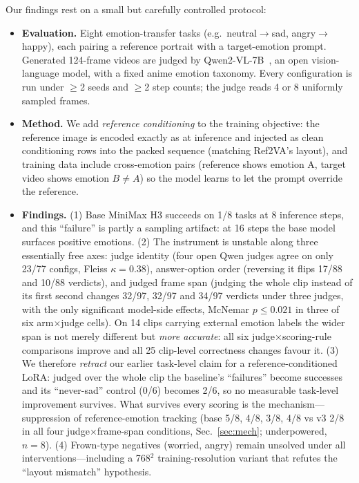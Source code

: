 \documentclass[conference]{IEEEtran}
\begin{document}
Our findings rest on a small but carefully controlled protocol:
\begin{itemize}
\item \textbf{Evaluation.} Eight emotion-transfer tasks (e.g.\ neutral$\rightarrow$sad,
angry$\rightarrow$happy), each pairing a reference portrait with a target-emotion prompt.
Generated 124-frame videos are judged by Qwen2-VL-7B~\cite{qwen2vl2024}, an open vision-language
model, with a fixed anime emotion taxonomy. Every configuration is run under $\ge$2 seeds and
$\ge$2 step counts; the judge reads 4 or 8 uniformly sampled frames.
\item \textbf{Method.} We add \emph{reference conditioning} to the training objective: the
reference image is encoded exactly as at inference and injected as clean conditioning rows into
the packed sequence (matching Ref2VA's layout), and training data include cross-emotion pairs
(reference shows emotion A, target video shows emotion $B\neq A$) so the model learns to let the
prompt override the reference.
\item \textbf{Findings.} (1) Base MiniMax H3 succeeds on 1/8 tasks at 8 inference steps, and this
``failure'' is partly a sampling artifact: at 16 steps the base model surfaces positive emotions.
(2) The instrument is unstable along three essentially free axes: judge identity (four open Qwen
judges agree on only 23/77 configs, Fleiss $\kappa{=}0.38$), answer-option order (reversing it flips
17/88 and 10/88 verdicts), and judged frame span (judging the whole clip instead of its first second
changes 32/97, 32/97 and 34/97 verdicts under three judges, with the only significant model-side
effects, McNemar $p{\le}0.021$ in three of six arm$\times$judge cells). On 14 clips carrying external
emotion labels the wider span is not merely different but \emph{more accurate}: all six
judge$\times$scoring-rule comparisons improve and all 25 clip-level correctness changes favour it.
(3) We therefore \emph{retract} our earlier task-level claim for a reference-conditioned LoRA: judged
over the whole clip the baseline's ``failures'' become successes and its ``never-sad'' control (0/6)
becomes 2/6, so no measurable task-level improvement survives. What survives every scoring is the
mechanism---suppression of reference-emotion tracking (base 5/8, 4/8, 3/8, 4/8 vs v3 2/8 in all four
judge$\times$frame-span conditions, Sec.~\ref{sec:mech}; underpowered, $n{=}8$). (4) Frown-type
negatives (worried, angry) remain unsolved under all interventions---including a 768$^2$
training-resolution variant that refutes the ``layout mismatch'' hypothesis.
\end{itemize}
\end{document}
